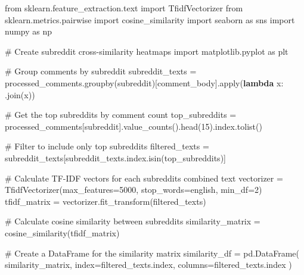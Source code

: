 \documentclass[
  12pt,
  letterpaper,
  DIV=11,
  numbers=noendperiod]{scrartcl}
\newenvironment{Shaded}{\begin{snugshade}}{\end{snugshade}}
\newcommand{\BuiltInTok}[1]{\textcolor[rgb]{0.00,0.23,0.31}{#1}}
\newcommand{\CommentTok}[1]{\textcolor[rgb]{0.37,0.37,0.37}{#1}}
\newcommand{\DecValTok}[1]{\textcolor[rgb]{0.68,0.00,0.00}{#1}}
\newcommand{\ImportTok}[1]{\textcolor[rgb]{0.00,0.46,0.62}{#1}}
\newcommand{\KeywordTok}[1]{\textcolor[rgb]{0.00,0.23,0.31}{\textbf{#1}}}
\newcommand{\NormalTok}[1]{\textcolor[rgb]{0.00,0.23,0.31}{#1}}
\newcommand{\OperatorTok}[1]{\textcolor[rgb]{0.37,0.37,0.37}{#1}}
\newcommand{\StringTok}[1]{\textcolor[rgb]{0.13,0.47,0.30}{#1}}
\begin{document}
\begin{Shaded}
\begin{Highlighting}[]
\ImportTok{from}\NormalTok{ sklearn.feature\_extraction.text }\ImportTok{import}\NormalTok{ TfidfVectorizer}
\ImportTok{from}\NormalTok{ sklearn.metrics.pairwise }\ImportTok{import}\NormalTok{ cosine\_similarity}
\ImportTok{import}\NormalTok{ seaborn }\ImportTok{as}\NormalTok{ sns}
\ImportTok{import}\NormalTok{ numpy }\ImportTok{as}\NormalTok{ np}

\CommentTok{\# Create subreddit cross{-}similarity heatmaps}
\ImportTok{import}\NormalTok{ matplotlib.pyplot }\ImportTok{as}\NormalTok{ plt}

\CommentTok{\# Group comments by subreddit}
\NormalTok{subreddit\_texts }\OperatorTok{=}\NormalTok{ processed\_comments.groupby(}\StringTok{\textquotesingle{}subreddit\textquotesingle{}}\NormalTok{)[}\StringTok{\textquotesingle{}comment\_body\textquotesingle{}}\NormalTok{].}\BuiltInTok{apply}\NormalTok{(}\KeywordTok{lambda}\NormalTok{ x: }\StringTok{\textquotesingle{} \textquotesingle{}}\NormalTok{.join(x))}

\CommentTok{\# Get the top subreddits by comment count}
\NormalTok{top\_subreddits }\OperatorTok{=}\NormalTok{ processed\_comments[}\StringTok{\textquotesingle{}subreddit\textquotesingle{}}\NormalTok{].value\_counts().head(}\DecValTok{15}\NormalTok{).index.tolist()}

\CommentTok{\# Filter to include only top subreddits}
\NormalTok{filtered\_texts }\OperatorTok{=}\NormalTok{ subreddit\_texts[subreddit\_texts.index.isin(top\_subreddits)]}

\CommentTok{\# Calculate TF{-}IDF vectors for each subreddit\textquotesingle{}s combined text}
\NormalTok{vectorizer }\OperatorTok{=}\NormalTok{ TfidfVectorizer(max\_features}\OperatorTok{=}\DecValTok{5000}\NormalTok{, stop\_words}\OperatorTok{=}\StringTok{\textquotesingle{}english\textquotesingle{}}\NormalTok{, min\_df}\OperatorTok{=}\DecValTok{2}\NormalTok{)}
\NormalTok{tfidf\_matrix }\OperatorTok{=}\NormalTok{ vectorizer.fit\_transform(filtered\_texts)}

\CommentTok{\# Calculate cosine similarity between subreddits}
\NormalTok{similarity\_matrix }\OperatorTok{=}\NormalTok{ cosine\_similarity(tfidf\_matrix)}

\CommentTok{\# Create a DataFrame for the similarity matrix}
\NormalTok{similarity\_df }\OperatorTok{=}\NormalTok{ pd.DataFrame(}
\NormalTok{    similarity\_matrix, }
\NormalTok{    index}\OperatorTok{=}\NormalTok{filtered\_texts.index, }
\NormalTok{    columns}\OperatorTok{=}\NormalTok{filtered\_texts.index}
\NormalTok{)}


\end{Highlighting}
\end{Shaded}
\end{document}
